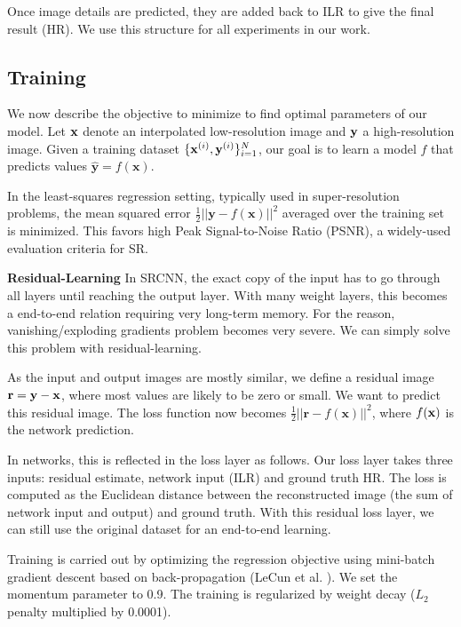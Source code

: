 \documentclass[10pt,twocolumn,letterpaper]{article}
\begin{document}
Once image details are predicted, they are added back to ILR to give the final result (HR). We use this structure for all experiments in our work.  


\subsection{Training}

We now describe the objective to minimize to find optimal parameters of our model. Let ${\bf x}$ denote an interpolated low-resolution image and ${\bf y}$ a high-resolution image. 
Given a training dataset $\{{\bf x}^{(i)},{\bf y}^{(i)}\}{}_{i=1}^{N}$, our goal is to learn a model $f$ that predicts values $\mathbf{\hat{y}}=f(\mathbf{x})$.

In the least-squares regression setting, typically used in super-resolution
problems, the mean squared error $\frac{1}{2}||\mathbf{y}-f(\mathbf{x})||^{2}$
averaged over the training set is minimized. This favors high Peak Signal-to-Noise
Ratio (PSNR), a widely-used evaluation criteria for SR. 

\textbf{Residual-Learning}  In SRCNN, the exact copy of the input has to go through all layers until reaching the output layer. With many weight layers, this becomes a end-to-end relation requiring very long-term memory. For the reason, vanishing/exploding gradients problem \cite{bengio1994learning} becomes very severe. We can simply solve this problem with residual-learning.

As the input and output images are mostly similar, we define a residual image ${\bf r}={\bf y}-{\bf x}$, where most values are likely to be zero or small. We want to predict this residual image. The loss function now becomes $\frac{1}{2}||\mathbf{r}-f(\mathbf{x})||^{2}$, where $f(\bf{x})$ is the network prediction. 

In networks, this is reflected in the loss layer as follows. 
Our loss layer takes three inputs: residual estimate, network input (ILR) and ground truth HR. The loss is computed as the Euclidean distance between the reconstructed image (the sum of network input and output) and ground truth. With this residual loss layer, we can still use the original dataset for an end-to-end learning.

Training is carried out by optimizing the regression objective using mini-batch gradient descent based on back-propagation (LeCun et al. \cite{lecun1998gradient}). We set the momentum parameter to 0.9. The training is regularized by weight decay ($L_2$ penalty multiplied by
0.0001).  
\end{document}
